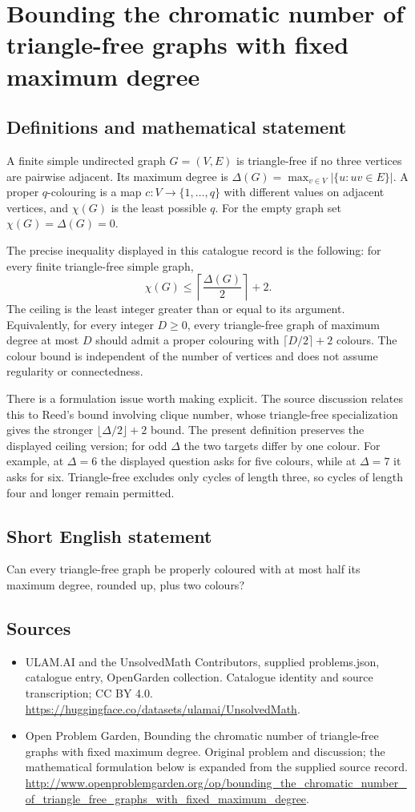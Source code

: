 \documentclass[11pt,a4paper]{article}
\begin{document}
\section*{Bounding the chromatic number of triangle-free graphs with fixed maximum degree}\label{statement}

\subsection{Definitions and mathematical statement}
A finite simple undirected graph $G=(V,E)$ is triangle-free if no three
vertices are pairwise adjacent. Its maximum degree is
$\Delta(G)=\max_{v\in V}|\{u:uv\in E\}|$. A proper $q$-colouring is a map
$c:V\to\{1,\ldots,q\}$ with different values on adjacent vertices, and
$\chi(G)$ is the least possible $q$. For the empty graph set
$\chi(G)=\Delta(G)=0$.

The precise inequality displayed in this catalogue record is the following:
for every finite triangle-free simple graph,
\[
                \chi(G)\le\left\lceil\frac{\Delta(G)}2\right\rceil+2.
\]
The ceiling is the least integer greater than or equal to its argument.
Equivalently, for every integer $D\ge0$, every triangle-free graph of
maximum degree at most $D$ should admit a proper colouring with
$\lceil D/2\rceil+2$ colours. The colour bound is independent of the number
of vertices and does not assume regularity or connectedness.

There is a formulation issue worth making explicit. The source discussion
relates this to Reed's bound involving clique number, whose triangle-free
specialization gives the stronger $\lfloor\Delta/2\rfloor+2$ bound. The
present definition preserves the displayed ceiling version; for odd
$\Delta$ the two targets differ by one colour. For example, at $\Delta=6$
the displayed question asks for five colours, while at $\Delta=7$ it asks
for six. Triangle-free excludes only cycles of length three, so cycles of
length four and longer remain permitted.
\subsection{Short English statement}
Can every triangle-free graph be properly coloured with at most half its maximum degree, rounded up, plus two colours?
\subsection{Sources}
\begin{itemize}
\item[S1] ULAM.AI and the UnsolvedMath Contributors, supplied problems.json, catalogue entry, OpenGarden collection. Catalogue identity and source transcription; CC BY 4.0.
\url{https://huggingface.co/datasets/ulamai/UnsolvedMath}.
\item[S2] Open Problem Garden, Bounding the chromatic number of triangle-free graphs with fixed maximum degree. Original problem and discussion; the mathematical formulation below is expanded from the supplied source record.
\url{http://www.openproblemgarden.org/op/bounding_the_chromatic_number_of_triangle_free_graphs_with_fixed_maximum_degree}.
\end{itemize}
\end{document}
